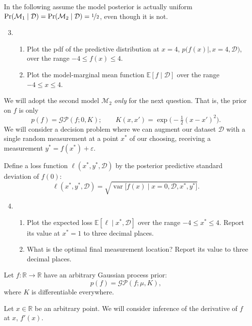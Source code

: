 \documentclass{article}
\newcommand{\given}{\mid}
\newcommand{\mc}[1]{\mathcal{#1}}
\newcommand{\data}{\mc{D}}
\newcommand{\model}{\mc{M}}
\newcommand{\R}{\mathbb{R}}
\DeclareMathOperator{\var}{var}
\begin{document}
In the following assume the model posterior is actually uniform $\Pr(\model_1
\given \data) = \Pr(\model_2 \given \data) = \nicefrac{1}{2}$, even though it is
not.
\begin{enumerate}\setcounter{enumi}{2}
\item
  \begin{enumerate}
  \item Plot the pdf of the predictive distribution at $x = 4$, $p\bigl(f(x)
    \given, x = 4, \data\bigr)$, over the range $-4 \leq f(x) \leq 4$.
  \item
    Plot the model-marginal mean function $\mathbb{E}[f \given \data]$ over the
    range $-4 \leq x \leq 4$.
  \end{enumerate}
\end{enumerate}
We will adopt the second model $\model_2$ \emph{only} for the next
question. That is, the prior on $f$ is only
\[
  p(f) = \mc{GP}(f; 0, K);
  \qquad
  K(x, x') = \exp\bigl(-\tfrac{1}{2}(x - x')^2\bigr).
\]
We will consider a decision problem where we can augment our dataset $\data$
with a single random measurement at a point $x^\ast$ of our choosing, receiving
a measurement $y^\ast = f(x^\ast) + \varepsilon$.

Define a loss function $\ell(x^\ast, y^\ast, \data)$ by the posterior predictive
standard deviation of $f(0)$:
\[
  \ell(x^\ast, y^\ast, \data) =
  \sqrt{\var\bigl[f(x) \given x = 0, \data, x^\ast, y^\ast\bigr]}.
\]

\begin{enumerate}\setcounter{enumi}{3}
\item
  \begin{enumerate}
  \item
    Plot the expected loss $\mathbb{E}[\ell \given x^\ast, \data]$ over the
    range $-4 \leq x^\ast \leq 4$. Report its value at $x^\ast = 1$ to three
    decimal places.
  \item
    What is the optimal final measurement location? Report its value to three
    decimal places.
  \end{enumerate}
\end{enumerate}

\clearpage

Let $f\colon \R \to \R$ have an arbitrary Gaussian process prior:
\[
  p(f) = \mc{GP}(f; \mu, K),
\]
where $K$ is differentiable everywhere.

Let $x \in \R$ be an arbitrary point. We will consider inference of the
derivative of $f$ at $x$, $f'(x)$.
\end{document}
